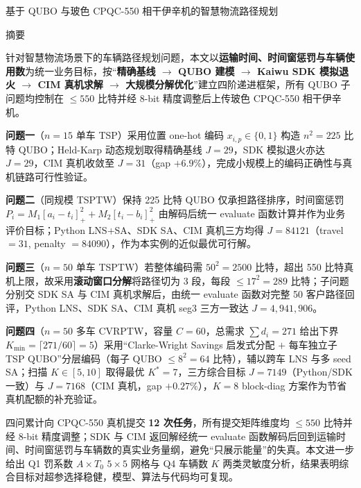 \documentclass[UTF8,12pt,a4paper]{ctexart}
\begin{document}
\begin{center}
{\selectfont
基于 QUBO 与玻色 CPQC-550 相干伊辛机的智慧物流路径规划}
\end{center}
\vspace{0.3em}

\begin{center}
{\selectfont 摘\quad 要}
\end{center}

针对智慧物流场景下的车辆路径规划问题，本文以\textbf{运输时间、时间窗惩罚与车辆使用数}为统一业务目标，按``\textbf{精确基线 $\rightarrow$ QUBO 建模 $\rightarrow$ Kaiwu SDK 模拟退火 $\rightarrow$ CIM 真机求解 $\rightarrow$ 大规模分解优化}''建立四阶递进框架，所有 QUBO 子问题均控制在 $\le 550$ 比特并经 8-bit 精度调整后上传玻色 CPQC-550 相干伊辛机。

\textbf{问题一}（$n=15$ 单车 TSP）采用位置 one-hot 编码 $x_{i,p}\!\in\!\{0,1\}$ 构造 $n^{2}=225$ 比特 QUBO；Held-Karp 动态规划取得精确基线 $J=29$，SDK 模拟退火亦达 $J=29$，CIM 真机收敛至 $J=31$（gap $+6.9\%$），完成小规模上的编码正确性与真机链路可行性验证。

\textbf{问题二}（同规模 TSPTW）保持 225 比特 QUBO 仅承担路径排序，时间窗惩罚 $P_i=M_1[a_i\!-\!t_i]_+^2+M_2[t_i\!-\!b_i]_+^2$ 由解码后统一 evaluate 函数计算并作为业务评价目标；Python LNS$+$SA、SDK SA、CIM 真机三方均得 $J=84121$（travel $=31$, penalty $=84090$），作为本实例的近似最优可行解。

\textbf{问题三}（$n=50$ 单车 TSPTW）若整体编码需 $50^{2}=2500$ 比特，超出 550 比特真机上限，故采用\textbf{滚动窗口分解}将路径切为 3 段，每段 $\le 17^{2}=289$ 比特；子问题分别交 SDK SA 与 CIM 真机求解后，由统一 evaluate 函数对完整 50 客户路径回评，Python LNS、SDK SA、CIM 真机 seg3 三方一致达 $J=4{,}941{,}906$。

\textbf{问题四}（$n=50$ 多车 CVRPTW，容量 $C=60$，总需求 $\sum d_i=271$ 给出下界 $K_{\min}=\lceil 271/60\rceil=5$）采用``Clarke-Wright Savings 启发式分配 $+$ 每车独立子 TSP QUBO''分层编码（每子 QUBO $\le 8^{2}=64$ 比特），辅以跨车 LNS 与多 seed SA；扫描 $K\!\in\![5,10]$ 取得最优 $K^{*}=7$，三方综合目标 $J=7149$（Python/SDK 一致）与 $J=7168$（CIM 真机，gap $+0.27\%$），$K=8$ block-diag 方案作为节省真机配额的补充验证。

四问累计向 CPQC-550 真机提交 \textbf{12 次任务}，所有提交矩阵维度均 $\le 550$ 比特并经 8-bit 精度调整；SDK 与 CIM 返回解经统一 evaluate 函数解码后回到运输时间、时间窗惩罚与车辆数的真实业务量纲，避免``只展示能量''的失真。本文进一步给出 Q1 罚系数 $A\!\times\!T_0$ $5\!\times\!5$ 网格与 Q4 车辆数 $K$ 两类灵敏度分析，结果表明综合目标对超参选择稳健，模型、算法与代码均可复现。
\end{document}
